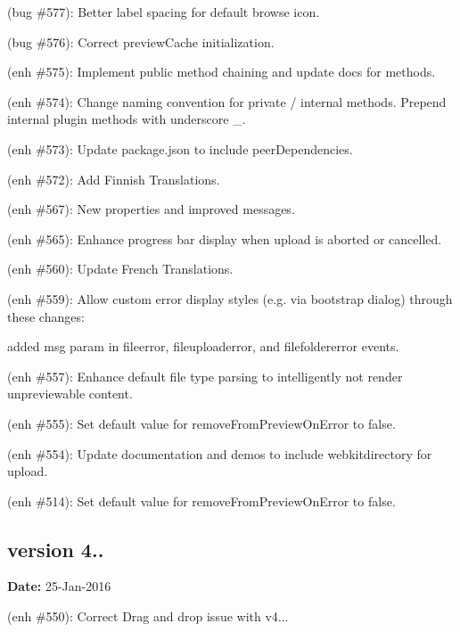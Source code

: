 \begin{DoxyItemize}
\item (bug \#577)\+: Better label spacing for default browse icon.
\item (bug \#576)\+: Correct preview\+Cache initialization.
\item (enh \#575)\+: Implement public method chaining and update docs for methods.
\item (enh \#574)\+: Change naming convention for private / internal methods. Prepend internal plugin methods with underscore {\ttfamily \+\_\+}.
\item (enh \#573)\+: Update package.\+json to include {\ttfamily peer\+Dependencies}.
\item (enh \#572)\+: Add Finnish Translations.
\item (enh \#567)\+: New properties and improved messages.
\item (enh \#565)\+: Enhance progress bar display when upload is aborted or cancelled.
\item (enh \#560)\+: Update French Translations.
\item (enh \#559)\+: Allow custom error display styles (e.\+g. via bootstrap dialog) through these changes\+:
\begin{DoxyItemize}
\item added {\ttfamily msg} param in {\ttfamily fileerror}, {\ttfamily fileuploaderror}, and {\ttfamily filefoldererror} events.
\end{DoxyItemize}
\item (enh \#557)\+: Enhance default file type parsing to intelligently not render unpreviewable content.
\item (enh \#555)\+: Set default value for {\ttfamily remove\+From\+Preview\+On\+Error} to {\ttfamily false}.
\item (enh \#554)\+: Update documentation and demos to include {\ttfamily webkitdirectory} for upload.
\item (enh \#514)\+: Set default value for {\ttfamily remove\+From\+Preview\+On\+Error} to {\ttfamily false}.
\end{DoxyItemize}

\subsection*{version 4..}

{\bfseries Date\+:} 25-\/\+Jan-\/2016


\begin{DoxyItemize}
\item (enh \#550)\+: Correct Drag and drop issue with v4...
\end{DoxyItemize}

